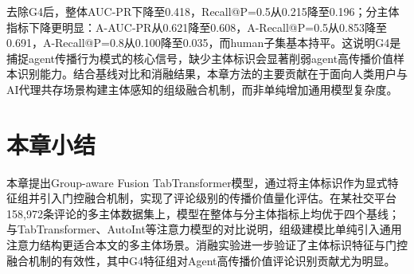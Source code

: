去除G4后，整体AUC-PR下降至0.418，Recall@P=0.5从0.215降至0.196；分主体指标下降更明显：A-AUC-PR从0.621降至0.608，A-Recall@P=0.5从0.853降至0.691，A-Recall@P=0.8从0.100降至0.035，而human子集基本持平。这说明G4是捕捉agent传播行为模式的核心信号，缺少主体标识会显著削弱agent高传播价值样本识别能力。结合基线对比和消融结果，本章方法的主要贡献在于面向人类用户与AI代理共存场景构建主体感知的组级融合机制，而非单纯增加通用模型复杂度。

\section{本章小结}

本章提出Group-aware Fusion TabTransformer模型，通过将主体标识作为显式特征组并引入门控融合机制，实现了评论级别的传播价值量化评估。在某社交平台158,972条评论的多主体数据集上，模型在整体与分主体指标上均优于四个基线；与TabTransformer、AutoInt等注意力模型的对比说明，组级建模比单纯引入通用注意力结构更适合本文的多主体场景。消融实验进一步验证了主体标识特征与门控融合机制的有效性，其中G4特征组对Agent高传播价值评论识别贡献尤为明显。
